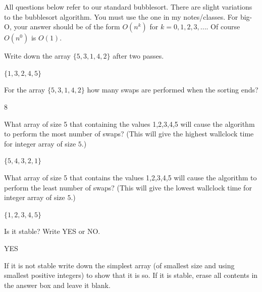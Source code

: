 

All questions below refer to our standard bubblesort.
There are slight variations to the bubblesort algorithm.
You must use the one in my notes/classes.
For big-O,
your answer should be of the form $O(n^k)$ for $k=0, 1, 2, 3, ...$.
Of course $O(n^0)$ is $O(1)$.

\nextq
Write down the array $\{ 5, 3, 1, 4, 2 \}$ after two passes.
\\
\ANSWER
\begin{answerlong}
$\{ 1, 3, 2, 4, 5 \}$
\end{answerlong}

\nextq
For the array $\{ 5, 3, 1, 4, 2 \}$ how many swaps are performed
when the sorting ends?
\\
\ANSWER
\begin{answerlong}
8
\end{answerlong}

\nextq
What array of size 5 that containing the values 1,2,3,4,5 will cause
the algorithm to perform the most number of swaps?
(This will give the highest wallclock time for integer array of size $5$.)
\\
\ANSWER
\begin{answerlong}
$\{ 5, 4, 3, 2, 1 \}$
\end{answerlong}

\nextq
What array of size 5 that contains the values 1,2,3,4,5 will cause
the algorithm to perform the least number of swaps?
(This will give the lowest wallclock time for integer array of size $5$.)
\\
\ANSWER
\begin{answerlong}
$\{ 1, 2, 3, 4, 5 \}$
\end{answerlong}

\nextq
Is it stable? Write YES or NO.
\\
\ANSWER
\begin{answerlong}
YES
\end{answerlong}

\nextq
If it is not stable write down the simplest array
(of smallest size and using smallest positive integers)
to show that it is so.
If it is stable, erase all contents in the answer box and leave it blank.
\\
\ANSWER
\begin{answerlong}
\end{answerlong}

